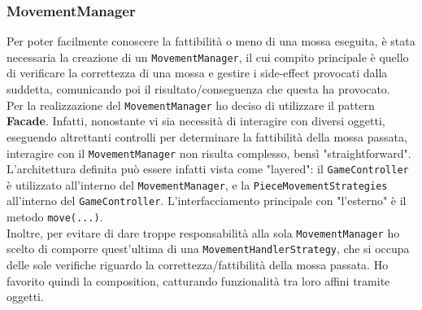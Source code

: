 \documentclass[a4paper,12pt]{report}
\begin{document}
\subsubsection*{MovementManager}
Per poter facilmente conoscere la fattibilità o meno di una mossa eseguita, è stata necessaria la creazione di un \texttt{MovementManager}, il cui compito principale è quello di verificare la correttezza di una mossa e gestire i side-effect provocati dalla suddetta, comunicando poi il risultato/conseguenza che questa ha provocato.\\
Per la realizzazione del \texttt{MovementManager} ho deciso di utilizzare il pattern \textbf{Facade}. Infatti, nonostante vi sia necessità di interagire con diversi oggetti, eseguendo altrettanti controlli per determinare la fattibilità della mossa passata, interagire con il \texttt{MovementManager} non risulta complesso, bensì "straightforward".
\\
L'architettura definita può essere infatti vista come "layered": il \texttt{GameController} è utilizzato all'interno del \texttt{MovementManager}, e la \texttt{PieceMovementStrategies} all'interno del \texttt{GameController}. L'interfacciamento principale con "l'esterno" è il metodo \texttt{move(...)}.\\
Inoltre, per evitare di dare troppe responsabilità alla sola \texttt{MovementManager} ho scelto di comporre quest'ultima di una \texttt{MovementHandlerStrategy}, che si occupa delle sole verifiche riguardo la correttezza/fattibilità della mossa passata. Ho favorito quindi la composition, catturando funzionalità tra loro affini tramite oggetti.
\end{document}
